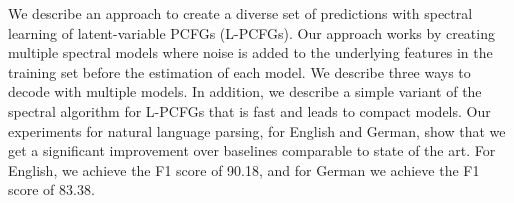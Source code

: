 We describe an approach to create a diverse set of predictions with spectral learning of latent-variable PCFGs (L-PCFGs). Our approach works by creating multiple spectral models where noise is added to the underlying features in the training set before the estimation of each model. We describe three ways to decode with multiple models. In addition, we describe a simple variant of the spectral algorithm for L-PCFGs that is fast and leads to compact models. Our experiments for natural language parsing, for English and German, show that we get a significant improvement over baselines comparable to state of the art. For English, we achieve the F1 score of 90.18, and for German we achieve the F1 score of 83.38.
